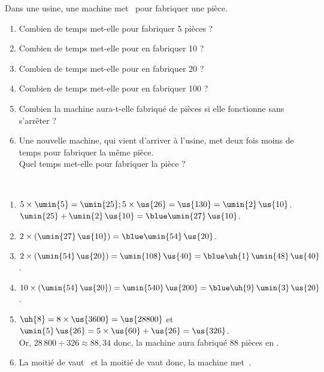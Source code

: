 \begin{colonne*exercice}
\bigskip


\begin{exercice} %
   Dans une usine, une machine met \, pour fabriquer une pièce.
   \begin{enumerate}
      \item Combien de temps met-elle pour fabriquer 5 pièces ?
      \item Combien de temps met-elle pour en fabriquer 10 ?
      \item Combien de temps met-elle pour en fabriquer 20 ?
      \item Combien de temps met-elle pour en fabriquer 100 ?
      \item Combien la machine aura-t-elle fabriqué de pièces si elle fonctionne  sans s’arrêter ?
      \item Une nouvelle machine, qui vient d’arriver à l’usine, met deux fois moins de temps pour fabriquer la même pièce. \\
      Quel temps met-elle pour fabriquer la pièce ?
   \end{enumerate}
\end{exercice}

\begin{corrige}
   \ \\ [-5mm]
   \begin{enumerate}
      \item $5\times\umin{5} =\umin{25} ; 5\times\us{26} =\us{130} =\umin{2}\,\us{10}$. \\
         $\umin{25}+\umin{2}\,\us{10} =\blue \umin{27}\,\us{10}$.
      \item $2\times(\umin{27}\,\us{10}) =\blue \umin{54}\,\us{20}$.
      \item $2\times(\umin{54}\,\us{20}) =\umin{108}\,\us{40} =\blue \uh{1}\,\umin{48}\,\us{40}$.
      \item $10\times(\umin{54}\,\us{20}) =\umin{540}\,\us{200} =\blue \uh{9}\,\umin{3}\,\us{20}$.
      \item $\uh{8} =8\times\us{3600} =\us{28800}$ et $\umin{5}\,\us{26} =5\times\us{60}+\us{26} =\us{326}$. \\
      Or, $28\,800\div326 \approx88,34$ donc, {\blue la machine aura fabriqué 88 pièces en }.
      \item La moitié de  vaut \, et la moitié de  vaut  donc, {\blue la machine met \,}.
   \end{enumerate}
\end{corrige}


\end{colonne*exercice}
